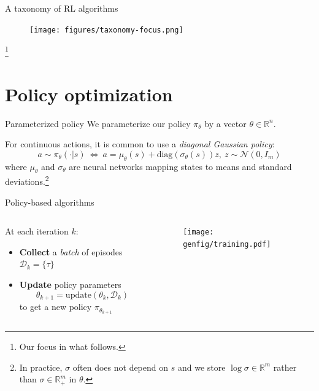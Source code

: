 \documentclass[10pt, aspectratio=1610]{beamer}
\newcommand\blfootnote[1]{%
  \begingroup
  \renewcommand\thefootnote{}%
  \footnote{#1}%
  \addtocounter{footnote}{-1}%
  \endgroup
}
\begin{document}
\begin{frame}{A taxonomy of RL algorithms}
    \begin{figure}
        \texttt{[image: figures/taxonomy-focus.png]}
    \end{figure}
    \blfootnote{
        Our focus in what follows.
    }
\end{frame}

\section{Policy optimization}

\begin{frame}{Parameterized policy}
    We parameterize our policy $\pi_\theta$ by a vector $\theta \in \mathbb{R}^n$.

    For continuous actions, it is common to use a \emph{diagonal Gaussian policy}:
    \[
        a \sim \pi_\theta(\cdot|s) \ \Longleftrightarrow \ a = \mu_\theta(s) + \mathrm{diag}(\sigma_\theta(s)) z, \ z \sim \mathcal{N}(0, I_m)
    \]
    where $\mu_\theta$ and $\sigma_\theta$ are neural networks mapping states to means and standard deviations.\footnote{In practice, $\sigma$ often does not depend on $s$ and we store $\log \sigma \in \mathbb{R}^m$ rather than $\sigma \in \mathbb{R}^m_+$ in $\theta$.}
\end{frame}

\begin{frame}{Policy-based algorithms}
    \begin{columns}
        \begin{column}{0.54\textwidth}
            At each iteration $k$:
            \begin{itemize}
                \item \textbf{Collect} a \emph{batch} of episodes $\mathcal{D}_k = \{ \tau \}$
                \item \textbf{Update} policy parameters $$\theta_{k+1} = \mathrm{update}(\theta_k, \mathcal{D}_k)$$ to get a new policy $\pi_{\theta_{k+1}}$
            \end{itemize}
        \end{column}
        \begin{column}{0.44\textwidth}
            \begin{figure}
                \texttt{[image: genfig/training.pdf]}
            \end{figure}
        \end{column}
    \end{columns}
\end{frame}
\end{document}
